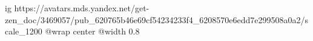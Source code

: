  
 
 
 
 

\ifcmt
  ig https://avatars.mds.yandex.net/get-zen_doc/3469057/pub_620765b46e69cf54234233f4_6208570e6edd7e299508a0a2/scale_1200
  @wrap center
  @width 0.8
\fi
